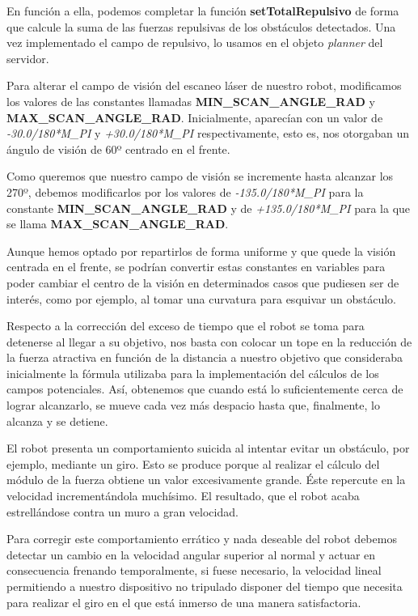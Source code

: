 \documentclass[a4paper, 11pt]{article}
\begin{document}
	En función a ella, podemos completar la función \textbf{setTotalRepulsivo} de forma que calcule la
	suma de las fuerzas repulsivas de los obstáculos detectados. Una vez implementado el campo de repulsivo,
	lo usamos en el objeto \textit{planner} del servidor.
	
	Para alterar el campo de visión del escaneo láser de nuestro robot, modificamos los valores de las
	constantes llamadas \textbf{MIN\_SCAN\_ANGLE\_RAD} y \textbf{MAX\_SCAN\_ANGLE\_RAD}. Inicialmente,
	aparecían con un valor de \textit{-30.0/180*M\_PI} y \textit{+30.0/180*M\_PI} respectivamente, esto
	es, nos otorgaban un ángulo de visión de 60º centrado en el frente.
	
	Como queremos que nuestro campo de visión se incremente hasta alcanzar los 270º, debemos modificarlos
	por los valores de \textit{-135.0/180*M\_PI} para la constante \textbf{MIN\_SCAN\_ANGLE\_RAD} y de
	\textit{+135.0/180*M\_PI} para la que se llama \textbf{MAX\_SCAN\_ANGLE\_RAD}.
	
	Aunque hemos optado por repartirlos de forma uniforme y que quede la visión centrada en el frente,
	se podrían convertir estas constantes en variables para poder cambiar el centro de la visión en
	determinados casos que pudiesen ser de interés, como por ejemplo, al tomar una curvatura para esquivar
	un obstáculo.

	Respecto a la corrección del exceso de tiempo que el robot se toma para detenerse al llegar a su
	objetivo, nos basta con colocar un tope en la reducción de la fuerza atractiva en función de la
	distancia a nuestro objetivo que consideraba inicialmente la fórmula utilizaba para la implementación
	del cálculos de los campos potenciales. Así, obtenemos que cuando está lo suficientemente cerca de
	lograr alcanzarlo, se mueve cada vez más despacio hasta que, finalmente, lo alcanza y se detiene.
	
	El robot presenta un comportamiento suicida al intentar evitar un obstáculo, por ejemplo, mediante
	un giro. Esto se produce porque al realizar el cálculo del módulo de la fuerza obtiene un valor
	excesivamente grande. Éste repercute en la velocidad incrementándola muchísimo. El resultado, que
	el robot acaba estrellándose contra un muro a gran velocidad.
	
	Para corregir este comportamiento errático y nada deseable del robot debemos detectar un cambio en
	la velocidad angular superior al normal y actuar en consecuencia frenando temporalmente, si fuese
	necesario, la velocidad lineal permitiendo a nuestro dispositivo no tripulado disponer del tiempo
	que necesita para realizar el giro en el que está inmerso de una manera satisfactoria.
	
\end{document}
